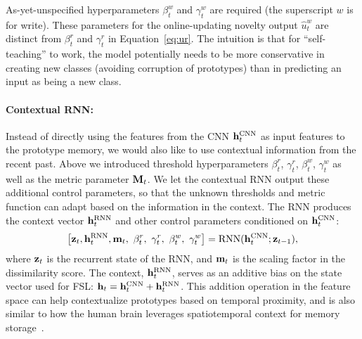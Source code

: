 As-yet-unspecified hyperparameters $\beta_t^w$ and $\gamma_t^w$ are required (the superscript $w$
is for write). These parameters for the online-updating novelty
output $\hat{u}_t^{w}$ are  distinct from $\beta_t^r$ and $\gamma_t^r$ in Equation~\ref{eq:ur}. The
intuition is that for ``self-teaching'' to work, the model potentially needs to be more conservative
in creating new classes (avoiding corruption of prototypes) than in predicting an input as being a
new class.





\vspace{-0.1in}
\paragraph{Contextual RNN:}
Instead of directly using the features from the CNN $\mathbf{h}_t^{\text{CNN}}$ as input features to the
prototype memory, we would also like to use contextual information from the recent past. Above we
introduced threshold hyperparameters $\beta_t^r$, $\gamma_t^r$, $\beta_t^w$, $\gamma_t^w$ as well as
the metric parameter $\mathbf{M}_t$. We let the contextual RNN output these additional control parameters,
so that the unknown thresholds and metric function can adapt based on the information in the
context. The RNN produces the context vector $\mathbf{h}_t^{\text{RNN}}$ and other control parameters
conditioned on  $\mathbf{h}_t^{\text{CNN}}$:
\begin{align}
\left[ \bz_t, \bh_t^{\text{RNN}}, \bmm_t, \ \beta^r_t, \ \gamma^r_t, \ \beta^w_t, \ \gamma^w_t
\right] =
\RNN(\bh_t^{\text{CNN}}; \bz_{t-1}),
\end{align}
where $\mathbf{z}_t$ is the recurrent state of the RNN, and $\mathbf{m}_t$ is the scaling factor in the
dissimilarity score. The context, $\mathbf{h}_t^{\text{RNN}}$, serves as an additive bias on the state
vector used for FSL: $\mathbf{h}_t  = \mathbf{h}_t^{\text{CNN}} + \mathbf{h}_t^{\text{RNN}}$. This addition operation in
the feature space can help contextualize prototypes based on temporal proximity, and is also similar
to how the human brain leverages spatiotemporal context for memory storage~\citep{ctxbinding}.


\vspace{-0.1in}
